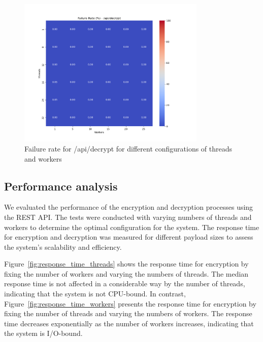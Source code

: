 \documentclass[cic,tc,english]{iiufrgs}
\begin{document}
            \begin{figure}[h]
                \centering
                \includegraphics[width=0.8\textwidth]{images/phase1/failure_rate__api_decrypt.png}
                \caption{Failure rate for /api/decrypt for different configurations of threads and workers}
                \label{fig:failureratedecrypt}
            \end{figure}

        \subsection{Performance analysis}
            \label{sec:timeencryptdecrypt}

            We evaluated the performance of the encryption and decryption processes using the REST API. The tests were conducted with varying numbers of threads and workers to determine the optimal configuration for the system. The response time for encryption and decryption was measured for different payload sizes to assess the system's scalability and efficiency.

            

            Figure~\ref{fig:response_time_threads} shows the response time for encryption by fixing the number of workers and varying the numbers of threads. The median response time is not affected in a considerable way by the number of threads, indicating that the system is not CPU-bound. In contrast, Figure~\ref{fig:response_time_workers} presents the response time for encryption by fixing the number of threads and varying the numbers of workers. The response time decreases exponentially as the number of workers increases, indicating that the system is I/O-bound.
\end{document}
